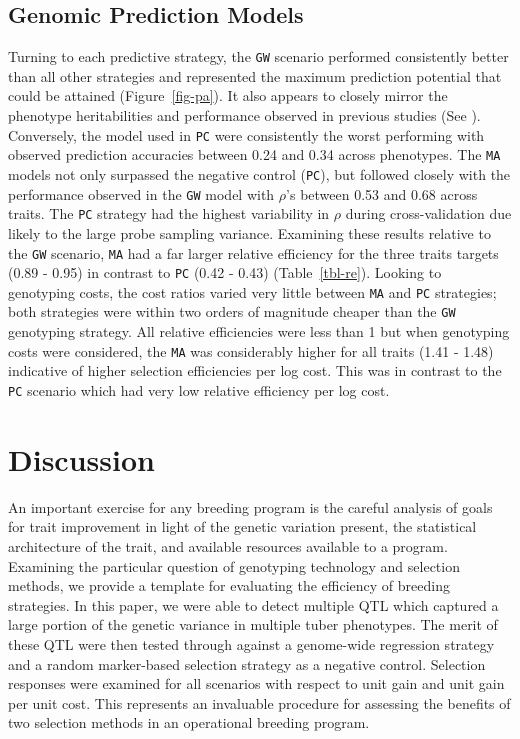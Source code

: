 \begin{refsection}
\begin{figure}
\end{figure}

\subsection{Genomic Prediction
Models}\label{genomic-prediction-models-1}

Turning to each predictive strategy, the \texttt{GW} scenario performed
consistently better than all other strategies and represented the maximum
prediction potential that could be attained (Figure~\ref{fig-pa}). It
also appears to closely mirror the phenotype heritabilities and
performance observed in previous studies (See \textcite{Adams2023}).
Conversely, the model used in \texttt{PC} were consistently the worst
performing with observed prediction accuracies between 0.24 and 0.34 across
phenotypes. The \texttt{MA} models not only surpassed the negative
control (\texttt{PC}), but followed closely with the performance
observed in the \texttt{GW} model with \(\rho\)'s between 0.53 and 0.68
across traits. The \texttt{PC} strategy had the highest variability in
\(\rho\) during cross-validation due likely to the large probe sampling
variance. Examining these results relative to the \texttt{GW} scenario,
\texttt{MA} had a far larger relative efficiency for the three traits
targets (0.89 - 0.95) in contrast to \texttt{PC} (0.42 - 0.43)
(Table~\ref{tbl-re}). Looking to genotyping costs, the cost ratios varied very little between \texttt{MA} and \texttt{PC} strategies; both strategies were within two orders of magnitude cheaper than the \texttt{GW} genotyping strategy. All relative efficiencies were less than 1 but
when genotyping costs were considered, the \texttt{MA} was considerably
higher for all traits (1.41 - 1.48) indicative of higher selection
efficiencies per log cost. This was in contrast to the \texttt{PC}
scenario which had very low relative efficiency per log cost.
\section{Discussion}

An important exercise for any breeding program is the careful analysis
of goals for trait improvement in light of the genetic variation
present, the statistical architecture of the trait, and available
resources available to a program. Examining the
particular question of genotyping technology and selection methods, we
provide a template for evaluating the efficiency of breeding strategies.
In this paper, we were able to detect multiple QTL which captured a
large portion of the genetic variance in multiple tuber phenotypes. The
merit of these QTL were then tested through against a genome-wide
regression strategy and a random marker-based selection strategy as a
negative control. Selection responses were examined for all scenarios
with respect to unit gain and unit gain per unit cost. This represents
an invaluable procedure for assessing the benefits of two selection
methods in an operational breeding program.


\end{refsection}
